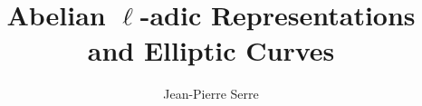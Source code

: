\documentclass[12pt]{book}
\title{Abelian $\ell$-adic Representations and Elliptic Curves}
\author{Jean-Pierre Serre}
\begin{document}
\maketitle

\frontmatter


\tableofcontents





\mainmatter








\nocite{*}
\printbibliography
\printindex
\end{document}
